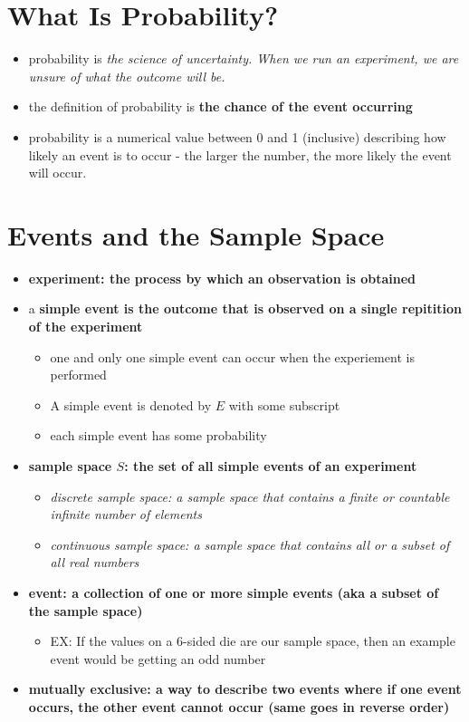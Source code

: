 \section{What Is Probability?}

\begin{itemize}
    \item probability is \it{the science of uncertainty}. When we run an experiment, we are unsure of what the outcome will be.
    \item the definition of probability is \bf{the chance of the event occurring}
    \item probability is a numerical value between 0 and 1 (inclusive) describing how likely an event is to occur - the larger the number, the more likely the event will occur.
\end{itemize}


\section{Events and the Sample Space}

\begin{itemize}
    \item \bf{experiment:} the process by which an observation is obtained
    \item a \bf{simple event} is the outcome that is observed on a single repitition of the experiment
    \begin{itemize}
        \item one and only one simple event can occur when the experiement is performed
        \item A simple event is denoted by $E$ with some subscript
        \item each simple event has some probability
    \end{itemize}

    \item \bf{sample space $S$:} the set of all simple events of an experiment
    \begin{itemize}
        \item \it{discrete sample space:} a sample space that contains a finite or countable infinite number of elements
        \item \it{continuous sample space:} a sample space that contains all or a subset of all real numbers
    \end{itemize}

    \item \bf{event:} a collection of one or more simple events (aka a subset of the sample space)
    \begin{itemize}
        \item EX: If the values on a 6-sided die are our sample space, then an example event would be getting an odd number
    \end{itemize}

    \item \bf{mutually exclusive:} a way to describe two events where if one event occurs, the other event cannot occur (same goes in reverse order)
\end{itemize}



